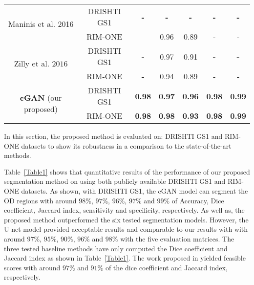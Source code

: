 \documentclass{IOS-Book-Article}
\begin{document}
\begin{table}[htb]
{\begin{tabular}{|c|c|c|c|c|c|c|}
                      
                             
\multirow{2}{*}{Maninis et al. 2016 \cite{maninis2016deep}}    & DRISHTI GS1             & \textbf{-} & \textbf{-} & \textbf{-} & \textbf{-} & \textbf{-} \\ \cline{2-7} 

                             & RIM-ONE  &          & 0.96          & 0.89          & -          & -          \\ \hline
                             
                             
\multirow{2}{*}{Zilly et al. $2016$ \cite{zilly2015boosting}}    & DRISHTI GS1             & \textbf{-} & 0.97 & 0.91 & \textbf{-} & \textbf{-} \\ \cline{2-7} 

                             & RIM-ONE  & \textbf{-} & 0.94          & 0.89          & -          & -          \\ \hline
                             
                             
\multirow{2}{*}{\textbf{cGAN} (our proposed)}      & DRISHTI GS1             & \textbf{0.98}          & \textbf{0.97 }         & \textbf{0.96 }         & \textbf{0.98  }        & \textbf{0.99 }         \\ \cline{2-7} 

                             & RIM-ONE  & \textbf{0.98}          & \textbf{0.98}          & \textbf{0.93}          & \textbf{0.98}          &\textbf{ 0.99 }         \\ \hline
\end{tabular}}
\end{table}

In this section, the proposed method is evaluated on: DRISHTI GS1 and RIM-ONE datasets
to show its robustness in a comparison to the state-of-the-art methods. 

Table~\ref{Table1} shows that quantitative results of the performance of our proposed segmentation method on using both publicly available DRISHTI GS1 and RIM-ONE datasets. As shown, with DRISHTI GS1, the cGAN model can segment the OD regions with around $98\%$, $97\%$, $96\%$, $97\%$ and $99\%$ of Accuracy, Dice coefficient, Jaccard index, sensitivity and specificity, respectively. As well as, the proposed method outperformed the six tested segmentation models. However, the U-net model provided acceptable results and comparable to our results with with around $97\%$, $95\%$, $90\%$, $96\%$ and $98\%$ with the five evaluation matrices. The three tested baseline methods have only computed the Dice coefficient and Jaccard index as shown in Table~\ref{Table1}. The work proposed in \cite{zilly2015boosting} yielded feasible scores with around $97\%$ and $91\%$ of the dice coefficient and Jaccard index, respectively.
\end{document}
